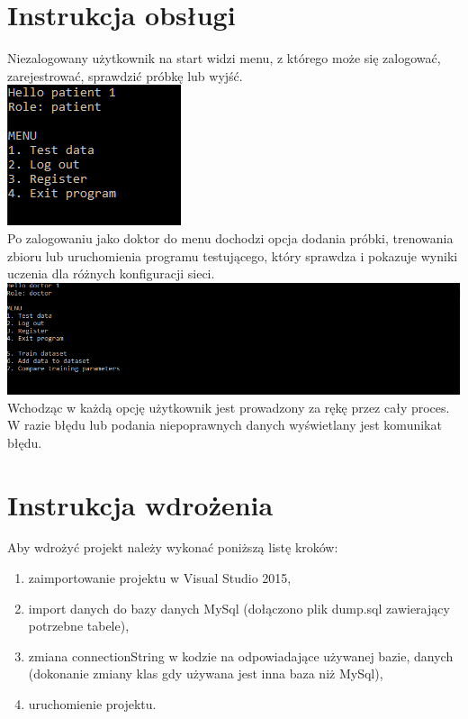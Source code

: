 \documentclass[12pt,a4paper]{article}
\begin{document}
	
\section*{Instrukcja obsługi}
Niezalogowany użytkownik na start widzi menu, z którego może się zalogować, zarejestrować, sprawdzić próbkę lub wyjść.\\
\includegraphics[width=0.5\linewidth]{media/menuPatient}\\
Po zalogowaniu jako doktor do menu dochodzi opcja dodania próbki, trenowania zbioru lub uruchomienia programu testującego, który sprawdza i pokazuje wyniki uczenia dla różnych konfiguracji sieci.\\
\includegraphics[width=0.9\linewidth]{media/menuDoctor}\\
Wchodząc w każdą opcję użytkownik jest prowadzony za rękę przez cały proces. W razie błędu lub podania niepoprawnych danych wyświetlany jest komunikat błędu.
	
\section*{Instrukcja wdrożenia}

	Aby wdrożyć projekt należy wykonać poniższą listę kroków:
	
	\begin{enumerate}
		\item zaimportowanie projektu w Visual Studio 2015,
		\item import danych do bazy danych MySql (dołączono plik dump.sql zawierający potrzebne tabele),
		\item zmiana connectionString w kodzie na odpowiadające używanej bazie,
		danych (dokonanie zmiany klas gdy używana jest inna baza niż MySql),
		\item uruchomienie projektu.
	\end{enumerate}
		
\end{document}
